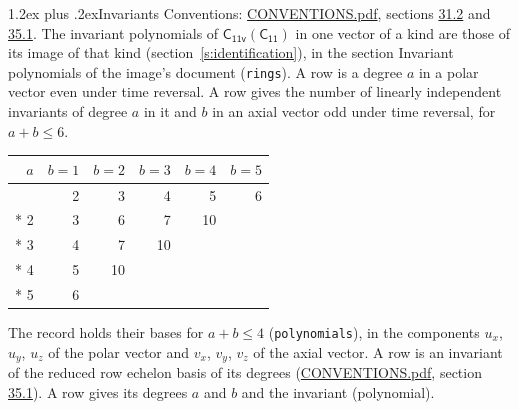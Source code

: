 \documentclass[10pt,a4paper]{article}
\makeatletter
\renewcommand\section{\@startsection{section}{1}{\z@}{-3ex plus -1ex minus -.2ex}%
  {1.2ex plus .2ex}{\normalfont\large\sffamily\bfseries\color{parttitle}}}
\numberwithin{equation}{section}
\newcommand{\grp}[1]{\mathsf{#1}}
\makeatother
\begin{document}
\section{Invariants}\label{s:invariants}
Conventions: \href{../../CONVENTIONS.pdf}{CONVENTIONS.pdf}, sections \href{../../CONVENTIONS.pdf\#conv.31.2}{31.2} and \href{../../CONVENTIONS.pdf\#conv.35.1}{35.1}.
The invariant polynomials of $\grp{C_{11v}}(\grp{C_{11}})$ in one vector of a kind are those of its image of that kind (section~\ref{s:identification}), in the section Invariant polynomials of the image's document (\texttt{rings}).
\leavevmode\label{n:index.degree.polar}\label{n:index.degree.axial}A row is a degree $a$ in a polar vector even under time reversal. A row gives the number of linearly independent invariants of degree $a$ in it and $b$ in an axial vector odd under time reversal, for $a + b \le 6$.
{\small\begin{longtable}{@{}rrrrrr@{}}\toprule
$a$ & $b = 1$ & $b = 2$ & $b = 3$ & $b = 4$ & $b = 5$\\\midrule\endhead
\bottomrule\endfoot\endlastfoot
1 & 2 & 3 & 4 & 5 & 6\\*
2 & 3 & 6 & 7 & 10 & \\*
3 & 4 & 7 & 10 &  & \\*
4 & 5 & 10 &  &  & \\*
5 & 6 &  &  &  & \\
\bottomrule\end{longtable}}
\leavevmode\label{n:local.component.polar}\label{n:local.component.axial}The record holds their bases for $a + b \le 4$ (\texttt{polynomials}), in the components $u_{x}$, $u_{y}$, $u_{z}$ of the polar vector and $v_{x}$, $v_{y}$, $v_{z}$ of the axial vector. \label{n:head.polynomial}A row is an invariant of the reduced row echelon basis of its degrees (\href{../../CONVENTIONS.pdf}{CONVENTIONS.pdf}, section \href{../../CONVENTIONS.pdf\#conv.35.1}{35.1}). A row gives its degrees $a$ and $b$ and the invariant (polynomial).
\end{document}
